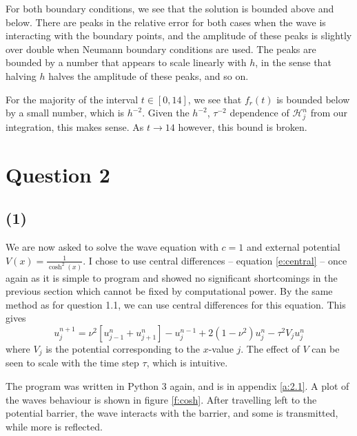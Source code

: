 \documentclass[10pt]{article}
\newcommand{\ujn}{u_{j}^{n}}
\newcommand{\ujpn}{u_{j+1}^{n}}
\newcommand{\ujmn}{u_{j-1}^{n}}
\newcommand{\ujnp}{u_{j}^{n+1}}
\newcommand{\ujnm}{u_{j}^{n-1}}
\begin{document}
For both boundary conditions, we see that the solution is bounded above and below. There
are peaks in the relative error for both cases when the wave is interacting with the boundary
points, and the amplitude of these peaks is slightly over double when Neumann boundary conditions
are used.
The peaks are bounded by a number that appears to scale linearly with $h$, in the sense that halving
$h$ halves the amplitude of these peaks, and so on.

For the majority of the interval $t\in [0,14]$, we see that $f_r(t)$ is bounded below by a
small number, which is $h^{-2}$. Given the $h^{-2}$, $\tau^{-2}$ dependence of
$\mathcal{H}_j^n$ from our integration, this makes sense.
As $t\to14$ however, this bound is broken.


\clearpage
\section*{Question 2}
\subsection*{(1)}
We are now asked to solve the wave equation with $c=1$ and external potential
$V(x) = \frac{1}{\cosh^2(x)}$.
I chose to use central differences -- equation \ref{e:central} -- once again as it
is simple to program and showed no significant shortcomings in the previous
section which cannot be fixed by computational power.
By the same method as for question 1.1, we can use central differences for this
equation. This gives
\begin{equation}
\ujnp = \nu^2 \left[\ujmn + \ujpn \right] - \ujnm + 2(1 - \nu^2)\ujn - \tau^2 V_j \ujn
\label{e:cdp}
\end{equation}
where $V_j$ is the potential corresponding to the $x$-value $j$. The effect of
$V$ can be seen to scale with the time step $\tau$, which is intuitive.

The program was written in Python 3 again, and is in appendix \ref{a:2.1}.
A plot of the waves behaviour is shown in figure \ref{f:cosh}.
After travelling left to the potential barrier, the wave interacts with the barrier,
and some is transmitted, while more is reflected.
\end{document}
